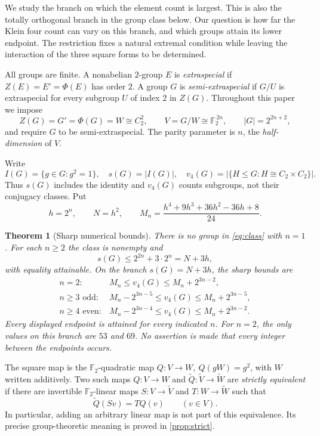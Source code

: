 \documentclass[11pt,a4paper]{article}
\newtheorem{theorem}{Theorem}[section]
\theoremstyle{definition}
\theoremstyle{remark}
\numberwithin{equation}{section}
\newcommand{\F}{\mathbb F}
\newcommand{\vfour}{v_4}
\begin{document}
We study the branch on which the element count is largest. This is also
the totally orthogonal branch in the group class below. Our question is
how far the Klein four count can vary on this branch, and which groups
attain its lower endpoint. The restriction fixes a natural extremal
condition while leaving the interaction of the three square forms to
be determined.

All groups are finite. A nonabelian \(2\)-group \(E\) is
\emph{extraspecial} if \(Z(E)=E'=\Phi(E)\) has order \(2\).
A group \(G\) is \emph{semi-extraspecial} if \(G/U\) is extraspecial for
every subgroup \(U\) of index \(2\) in \(Z(G)\).
Throughout this paper we impose
\begin{equation}\label{eq:class}
 Z(G)=G'=\Phi(G)=W\cong C_2^2,\qquad
 V=G/W\cong\F_2^{\,2n},\qquad |G|=2^{2n+2},
\end{equation}
and require \(G\) to be semi-extraspecial.
The parity parameter is \(n\), the \emph{half-dimension} of \(V\).

Write
\[
 I(G)=\{g\in G:g^2=1\},\quad s(G)=|I(G)|,\quad
 \vfour(G)=|\{H\leq G:H\cong C_2\times C_2\}|.
\]
Thus \(s(G)\) includes the identity and \(\vfour(G)\) counts subgroups,
not their conjugacy classes. Put
\begin{equation}\label{eq:Mn}
 h=2^n,\qquad N=h^2,\qquad
 M_n=\frac{h^4+9h^3+36h^2-36h+8}{24}.
\end{equation}

\begin{theorem}[Sharp numerical bounds]\label{thm:bounds}
There is no group in \eqref{eq:class} with \(n=1\).
For each \(n\geq2\) the class is nonempty and
\[
 s(G)\leq 2^{2n}+3\cdot2^n=N+3h,
\]
with equality attainable. On the branch \(s(G)=N+3h\), the sharp bounds
are
\begin{equation}\label{eq:bounds}
\begin{array}{ll}
 n=2:& M_n\leq\vfour(G)\leq M_n+2^{3n-2},\\[2pt]
 n\geq3\text{ odd}:&
 M_n-2^{3n-5}\leq\vfour(G)\leq M_n+2^{3n-5},\\[2pt]
 n\geq4\text{ even}:&
 M_n-2^{3n-4}\leq\vfour(G)\leq M_n+2^{3n-2}.
\end{array}
\end{equation}
Every displayed endpoint is attained for every indicated \(n\).
For \(n=2\), the only values on this branch are \(53\) and \(69\).
No assertion is made that every integer between the endpoints occurs.
\end{theorem}

The square map is the \(\F_2\)-quadratic map
\(Q:V\to W,\ Q(gW)=g^2\), with \(W\) written additively.
Two such maps \(Q:V\to W\) and \(\widetilde Q:\widetilde V\to\widetilde W\)
are \emph{strictly equivalent} if there are invertible
\(\F_2\)-linear maps \(S:V\to\widetilde V\) and \(T:W\to\widetilde W\) such that
\begin{equation}\label{eq:strict}
 \widetilde Q(Sv)=TQ(v)\qquad(v\in V).
\end{equation}
In particular, adding an arbitrary linear map is not part of this
equivalence. Its precise group-theoretic meaning is proved in
\cref{prop:strict}.
\end{document}
